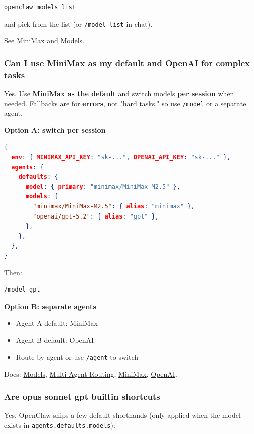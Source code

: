 \begin{lstlisting}[language=bash]
   openclaw models list
\end{lstlisting}


and pick from the list (or \texttt{/model list} in chat).

See \href{/providers/minimax}{MiniMax} and \href{/concepts/models}{Models}.

\subsubsection{Can I use MiniMax as my default and OpenAI for complex tasks}


Yes. Use \textbf{MiniMax as the default} and switch models \textbf{per session} when needed.
Fallbacks are for \textbf{errors}, not "hard tasks," so use \texttt{/model} or a separate agent.

\textbf{Option A: switch per session}

\begin{lstlisting}[language=json]
{
  env: { MINIMAX_API_KEY: "sk-...", OPENAI_API_KEY: "sk-..." },
  agents: {
    defaults: {
      model: { primary: "minimax/MiniMax-M2.5" },
      models: {
        "minimax/MiniMax-M2.5": { alias: "minimax" },
        "openai/gpt-5.2": { alias: "gpt" },
      },
    },
  },
}
\end{lstlisting}


Then:

\begin{lstlisting}
/model gpt
\end{lstlisting}


\textbf{Option B: separate agents}

\begin{itemize}
  \item Agent A default: MiniMax
  \item Agent B default: OpenAI
  \item Route by agent or use \texttt{/agent} to switch
\end{itemize}


Docs: \href{/concepts/models}{Models}, \href{/concepts/multi-agent}{Multi-Agent Routing}, \href{/providers/minimax}{MiniMax}, \href{/providers/openai}{OpenAI}.

\subsubsection{Are opus sonnet gpt builtin shortcuts}


Yes. OpenClaw ships a few default shorthands (only applied when the model exists in \texttt{agents.defaults.models}):

